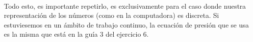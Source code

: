 \documentclass[a4paper]{article}
\begin{document}
~\\

Todo esto, es importante repetirlo, es exclusivamente para el caso donde nuestra representación de los números (como en la computadora) es discreta. Si estuviesemos en un ámbito de trabajo continuo, la ecuación de presión que se usa es la misma que está en la guía 3 del ejercicio 6.







 
\end{document}
